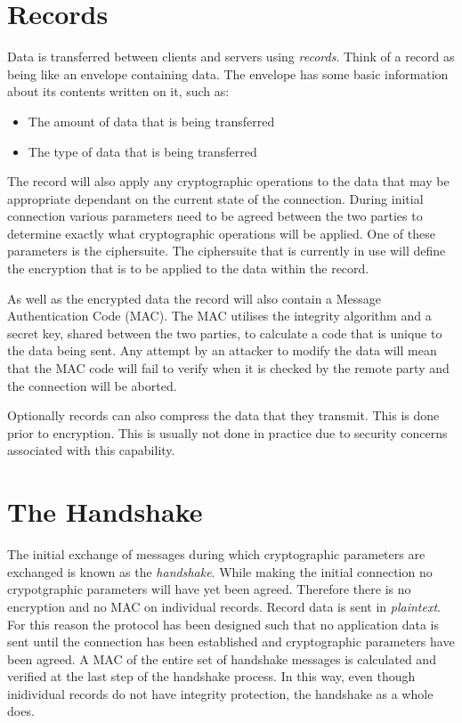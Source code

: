 \section{Records}

Data is transferred between clients and servers using \emph{records}. Think of 
a record as being like an envelope containing data. The envelope has some basic 
information about its contents written on it, such as:
\begin{itemize}
\item The amount of data that is being transferred
\item The type of data that is being transferred
\end{itemize}

The record will also apply any cryptographic operations to the data that may be 
appropriate dependant on the current state of the connection. During initial 
connection various parameters need to be agreed between the two parties to 
determine exactly what cryptographic operations will be applied. One of these 
parameters is the ciphersuite. The ciphersuite that is currently in use will 
define the encryption that is to be applied to the data within the record.

As well as the encrypted data the record will also contain a Message 
Authentication Code (MAC). The MAC utilises the integrity algorithm and a 
secret key, shared between the two parties, to calculate a code that is unique
to the data being sent. Any attempt by an attacker to modify the data will mean
that the MAC code will fail to verify when it is checked by the remote party 
and the connection will be aborted.

Optionally records can also compress the data that they transmit. This is done 
prior to encryption. This is usually not done in practice due to security 
concerns associated with this capability.

\section{The Handshake}

The initial exchange of messages during which cryptographic parameters are 
exchanged is known as the \emph{handshake}. While making the initial connection
no crypotgraphic parameters will have yet been agreed. Therefore there is no
encryption and no MAC on individual records.  Record data is sent in
\emph{plaintext}. For this reason the protocol has been designed such that no
application data is sent until the connection has been established and
cryptographic parameters have been agreed. A MAC of the entire set of handshake 
messages is calculated and verified at the last step of the handshake process. 
In this way, even though inidividual records do not have integrity protection, 
the handshake as a whole does.

